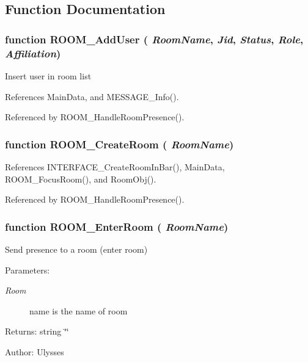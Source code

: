 \subsection{Function Documentation}
\subsubsection{\setlength{\rightskip}{0pt plus 5cm}function ROOM\_\-AddUser ( {\em RoomName}, \/   {\em Jid}, \/   {\em Status}, \/   {\em Role}, \/   {\em Affiliation})}\label{room_2room_8js_d458a1c31c7bc15a3e6d33fb2ec66bcb}


Insert user in room list 

References MainData, and MESSAGE\_\-Info().

Referenced by ROOM\_\-HandleRoomPresence().
\subsubsection{\setlength{\rightskip}{0pt plus 5cm}function ROOM\_\-CreateRoom ( {\em RoomName})}\label{room_2room_8js_f6fef7f6fb3a2e158577ab49889bb426}




References INTERFACE\_\-CreateRoomInBar(), MainData, ROOM\_\-FocusRoom(), and RoomObj().

Referenced by ROOM\_\-HandleRoomPresence().
\subsubsection{\setlength{\rightskip}{0pt plus 5cm}function ROOM\_\-EnterRoom ( {\em RoomName})}\label{room_2room_8js_bf1ecfaa126d14e1beffee4131c0f3b8}


Send presence to a room (enter room)

\begin{Desc}
\item[Parameters:]
\begin{description}
\item[{\em Room}]name is the name of room \end{description}
\end{Desc}
\begin{Desc}
\item[Returns:]string \char`\"{}\char`\"{} \end{Desc}
\begin{Desc}
\item[Author:]Ulysses \end{Desc}


